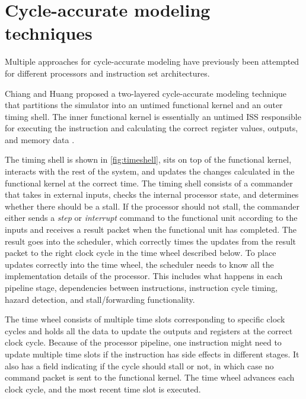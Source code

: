 


\section{Cycle-accurate modeling techniques}
\label{sec:bg_cycle-accurate}

Multiple approaches for cycle-accurate modeling have previously been attempted for different processors and instruction set architectures.

Chiang and Huang proposed a two-layered cycle-accurate modeling technique that partitions the simulator into an untimed functional kernel and an outer timing shell. The inner functional kernel is essentially an untimed ISS responsible for executing the instruction and calculating the correct register values, outputs, and memory data \cite{chiangEfficientTwolayeredCycleaccurate2009}.

The timing shell is shown in \cref{fig:timeshell}, sits on top of the functional kernel, interacts with the rest of the system, and updates the changes calculated in the functional kernel at the correct time. The timing shell consists of a commander that takes in external inputs, checks the internal processor state, and determines whether there should be a stall. If the processor should not stall, the commander either sends a \textit{step} or \textit{interrupt} command to the functional unit according to the inputs and receives a result packet when the functional unit has completed. The result goes into the scheduler, which correctly times the updates from the result packet to the right clock cycle in the time wheel described below. To place updates correctly into the time wheel, the scheduler needs to know all the implementation details of the processor. This includes what happens in each pipeline stage, dependencies between instructions, instruction cycle timing, hazard detection, and stall/forwarding functionality. \cite{chiangEfficientTwolayeredCycleaccurate2009}


The time wheel consists of multiple time slots corresponding to specific clock cycles and holds all the data to update the outputs and registers at the correct clock cycle. Because of the processor pipeline, one instruction might need to update multiple time slots if the instruction has side effects in different stages. It also has a field indicating if the cycle should stall or not, in which case no command packet is sent to the functional kernel. The time wheel advances each clock cycle, and the most recent time slot is executed.

